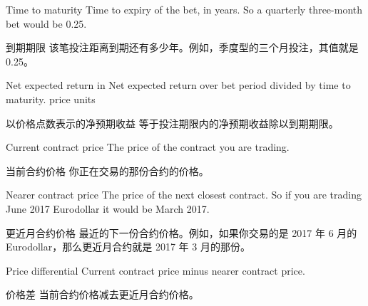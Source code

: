 \bipairgap

\begin{englishblock} Time to maturity Time to expiry of the bet, in years. So a quarterly three-month bet would be 0.25. \end{englishblock}

\begin{chineseblock}到期期限 该笔投注距离到期还有多少年。例如，季度型的三个月投注，其值就是 0.25。 \end{chineseblock}

\bipairgap

\begin{englishblock} Net expected return in Net expected return over bet period divided by time to maturity. price units \end{englishblock}

\begin{chineseblock}以价格点数表示的净预期收益 等于投注期限内的净预期收益除以到期期限。\end{chineseblock}


\begin{englishblock} Current contract price The price of the contract you are trading. \end{englishblock}

\begin{chineseblock}当前合约价格 你正在交易的那份合约的价格。\end{chineseblock}

\bipairgap

\begin{englishblock} Nearer contract price The price of the next closest contract. So if you are trading June 2017 Eurodollar it would be March 2017. \end{englishblock}

\begin{chineseblock}更近月合约价格 最近的下一份合约价格。例如，如果你交易的是 2017 年 6 月的 Eurodollar，那么更近月合约就是 2017 年 3 月的那份。\end{chineseblock}

\bipairgap

\begin{englishblock} Price differential Current contract price minus nearer contract price. \end{englishblock}

\begin{chineseblock}价格差 当前合约价格减去更近月合约价格。\end{chineseblock}

